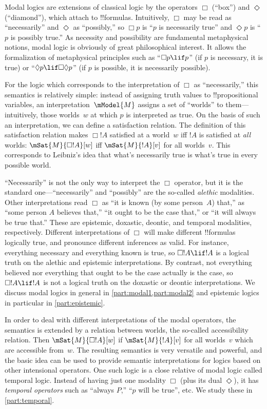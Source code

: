 Modal logics are extensions of classical logic by the operators $\Box$
(``box'') and $\Diamond$ (``diamond''), which attach to !!{formula}s.
Intuitively, $\Box$ may be read as ``necessarily'' and $\Diamond$ as
``possibly,'' so $\Box p$ is ``$p$ is necessarily true'' and $\Diamond
p$ is ``$p$ is possibly true.'' As necessity and possibility are
fundamental metaphysical notions, modal logic is obviously of great
philosophical interest. It allows the formalization of metaphysical
principles such as ``$\Box p \lif p$'' (if $p$ is necessary, it is
true) or ``$\Diamond p \lif \Box\Diamond p$'' (if $p$ is possible,
it is necessarily possible).

For the logic which corresponds to the interpretation of $\Box$ as
``necessarily,'' this semantics is relatively simple: instead of
assigning truth values to !!{propositional variable}s, an
interpretation~$\mModel{M}$ assigns a set of ``worlds'' to
them---intuitively, those worlds~$w$ at which $p$ is interpreted as
true. On the basis of such an interpretation, we can define a
satisfaction relation. The definition of this satisfaction relation
makes $\Box !A$ satisfied at a world~$w$ iff $!A$ is satisfied at
\emph{all} worlds: $\mSat{M}{\Box !A}[w]$ iff $\mSat{M}{!A}[v]$ for
all worlds~$v$. This corresponds to Leibniz's idea that what's
necessarily true is what's true in every possible world.

``Necessarily'' is not the only way to interpret the $\Box$ operator,
but it is the standard one---``necessarily'' and ``possibly'' are the
so-called \emph{alethic} modalities. Other interpretations read $\Box$
as ``it is known (by some person~$A$) that,'' as ``some person $A$
believes that,'' ``it ought to be the case that,'' or ``it will always
be true that.'' These are epistemic, doxastic, deontic, and temporal
modalities, respectively. Different interpretations of $\Box$ will
make different !!{formula}s logically true, and pronounce different
inferences as valid. For instance, everything necessary and everything
known is true, so $\Box !A \lif !A$ is a logical truth on the alethic
and epistemic interpretations. By contrast, not everything believed
nor everything that ought to be the case actually is the case, so
$\Box !A \lif !A$ is not a logical truth on the doxastic or deontic
interpretations. We discuss modal logics in general in
\cref{part:modal1,part:modal2} and epistemic logics in particular in
\cref{part:epistemic}.

In order to deal with different interpretations of the modal
operators, the semantics is extended by a relation between worlds, the
so-called accessibility relation.  Then $\mSat{M}{\Box !A}[w]$ if
$\mSat{M}{!A}[v]$ for all worlds~$v$ which are accessible from~$w$.
The resulting semantics is very versatile and powerful, and the basic
idea can be used to provide semantic interpretations for logics based
on other intensional operators. One such logic is a close relative of
modal logic called temporal logic. Instead of having just one modality
$\Box$ (plus its dual $\Diamond$), it has \emph{temporal operators}
such as ``always $P$,'' ``$p$ will be true'', etc. We study these in
\cref{part:temporal}.

